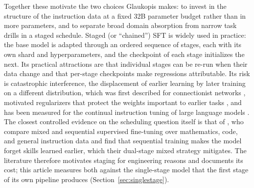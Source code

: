 \documentclass[a4paper,fleqn]{cas-dc}
\begin{document}
Together these motivate the two choices Glaukopis makes: to invest in the structure of the instruction data at a fixed 32B parameter budget rather than in more parameters, and to separate broad domain absorption from narrow task drills in a staged schedule. Staged (or ``chained'') SFT is widely used in practice: the base model is adapted through an ordered sequence of stages, each with its own shard and hyperparameters, and the checkpoint of each stage initializes the next. Its practical attractions are that individual stages can be re-run when their data change and that per-stage checkpoints make regressions attributable. Its risk is catastrophic interference, the displacement of earlier learning by later training on a different distribution, which was first described for connectionist networks \citep{mccloskey1989catastrophic}, motivated regularizers that protect the weights important to earlier tasks \citep{kirkpatrick2017ewc}, and has been measured for the continual instruction tuning of large language models \citep{luo2023forgetting}. The closest controlled evidence on the scheduling question itself is that of \citet{dong2024composition}, who compare mixed and sequential supervised fine-tuning over mathematics, code, and general instruction data and find that sequential training makes the model forget skills learned earlier, which their dual-stage mixed strategy mitigates. The literature therefore motivates staging for engineering reasons and documents its cost; this article measures both against the single-stage model that the first stage of its own pipeline produces (Section~\ref{sec:singlestage}).
\end{document}
